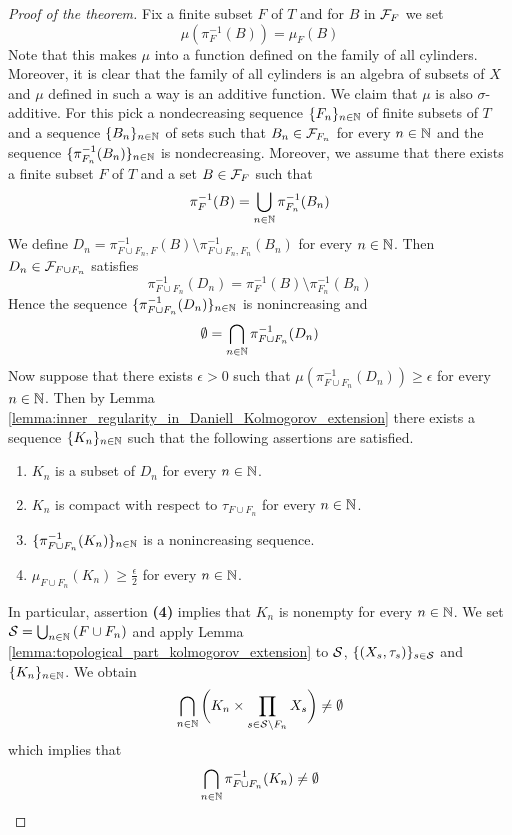 \begin{proof}[Proof of the theorem]
Fix a finite subset $F$ of $T$ and for $B$ in ${\mathcal F}_F$ we set
$$\mu\left(\pi^{-1}_F(B)\right) = \mu_F(B)$$
Note that this makes $\mu$ into a function defined on the family of all cylinders. Moreover, it is clear that the family of all cylinders is an algebra of subsets of $X$ and $\mu$ defined in such a way is an additive function. We claim that $\mu$ is also $\sigma$-additive. For this pick a nondecreasing sequence $\{F_n\}_{n\in {\mathbb N}}$ of finite subsets of $T$ and a sequence $\{B_n\}_{n\in {\mathbb N}}$ of sets such that $B_n\in {\mathcal F}_{F_n}$ for every $n\in {\mathbb N}$ and the sequence $\{\pi_{F_n}^{-1}(B_n)\}_{n\in {\mathbb N}}$ is nondecreasing. Moreover, we assume that there exists a finite subset $F$ of $T$ and a set $B \in {\mathcal F}_{F}$ such that 
$$\pi_{F}^{-1}(B) = \bigcup_{n\in {\mathbb N}}\pi_{F_n}^{-1}(B_n)$$
We define $D_n = \pi_{F\cup F_n,F}^{-1}(B)\setminus \pi_{F\cup F_n,F_n}^{-1}(B_n)$ for every $n\in {\mathbb N}$. Then $D_n \in {\mathcal F}_{F\cup F_n}$ satisfies
$$\pi^{-1}_{F\cup F_n}(D_n) = \pi_F^{-1}(B)\setminus \pi^{-1}_{F_n}(B_n)$$
Hence the sequence $\{\pi^{-1}_{F\cup F_n}(D_n)\}_{n\in {\mathbb N}}$ is nonincreasing and 
$$\emptyset = \bigcap_{n\in {\mathbb N}}\pi^{-1}_{F\cup F_n}(D_n)$$
Now suppose that there exists $\epsilon > 0$ such that $\mu\left(\pi^{-1}_{F\cup F_n}(D_n)\right) \geq \epsilon$ for every $n\in {\mathbb N}$. Then by Lemma \ref{lemma:inner_regularity_in_Daniell_Kolmogorov_extension} there exists a sequence $\{K_n\}_{n\in {\mathbb N}}$ such that the following assertions are satisfied.
\begin{enumerate}[label=\textbf{(\arabic*)}, leftmargin=*]
\item $K_n$ is a subset of $D_n$ for every $n\in {\mathbb N}$.
\item $K_n$ is compact with respect to $\tau_{F\cup F_n}$ for every $n\in {\mathbb N}$.
\item $\{\pi^{-1}_{F\cup F_n}(K_n)\}_{n\in {\mathbb N}}$ is a nonincreasing sequence.
\item $\mu_{F\cup F_n}(K_n) \geq \frac{\epsilon}{2}$ for every $n\in {\mathbb N}$.
\end{enumerate}
In particular, assertion \textbf{(4)} implies that $K_n$ is nonempty for every $n\in {\mathbb N}$. We set ${\mathcal S} = \bigcup_{n\in {\mathbb N}}\left(F\cup F_n\right)$ and apply Lemma \ref{lemma:topological_part_kolmogorov_extension} to ${\mathcal S}$, $\{(X_s,\tau_s)\}_{s\in {\mathcal S}}$ and $\{K_n\}_{n\in {\mathbb N}}$. We obtain
$$\bigcap_{n\in {\mathbb N}}\bigg(K_n\times \prod_{s\in {\mathcal S}\setminus F_n}X_s\bigg) \neq \emptyset$$
which implies that
$$\bigcap_{n\in {\mathbb N}}\pi^{-1}_{F\cup F_n}(K_n) \neq \emptyset$$

\end{proof}
